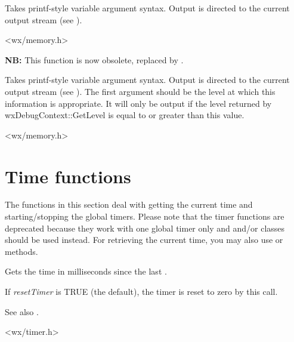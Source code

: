 Takes printf-style variable argument syntax. Output
is directed to the current output stream (see ).


<wx/memory.h>

\label{wxtracelevel}


{\bf NB:} This function is now obsolete, replaced by .

Takes printf-style variable argument syntax. Output
is directed to the current output stream (see ).
The first argument should be the level at which this information is appropriate.
It will only be output if the level returned by wxDebugContext::GetLevel is equal to or greater than
this value.


<wx/memory.h>

\section{Time functions}\label{timefunctions}

The functions in this section deal with getting the current time and
starting/stopping the global timers. Please note that the timer functions are
deprecated because they work with one global timer only and
 and/or  classes
should be used instead. For retrieving the current time, you may also use
 or
 methods.

\label{wxgetelapsedtime}


Gets the time in milliseconds since the last .

If {\it resetTimer} is TRUE (the default), the timer is reset to zero
by this call.

See also .


<wx/timer.h>

\label{wxgetlocaltime}

